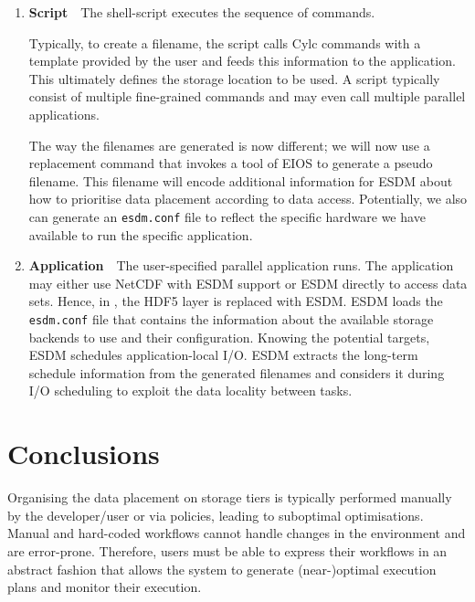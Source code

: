 \documentclass[a4paper]{article}
\begin{document}
\begin{enumerate}
  \item \textbf{Script}\ \ The shell-script executes the sequence of commands.

  Typically, to create a filename, the script calls Cylc commands with a template provided by the user and feeds this information to the application.
  This ultimately defines the storage location to be used.
  A script typically consist of multiple fine-grained commands and may even call multiple parallel applications.

  The way the filenames are generated is now different; we will now use a replacement command that invokes a tool of EIOS to generate a pseudo filename.
  This filename will encode additional information for ESDM about how to prioritise data placement according to data access.
  Potentially, we also can generate an \texttt{esdm.conf} file to reflect the specific hardware we have available to run the specific application.

  \item \textbf{Application}\ \ The user-specified parallel application runs.
  The application may either use NetCDF with ESDM support or ESDM directly to access data sets.
  Hence, in , the HDF5 layer is replaced with ESDM.
  ESDM loads the \texttt{esdm.conf} file that contains the information about the available storage backends to use and their configuration.
  Knowing the potential targets, ESDM schedules application-local I/O.
  ESDM extracts the long-term schedule information from the generated filenames and considers it during I/O scheduling to exploit the data locality between tasks.
\end{enumerate}



\section{Conclusions}
\label{sec:conclusions}

Organising the data placement on storage tiers is typically performed manually by the developer/user or via policies, leading to suboptimal optimisations.
Manual and hard-coded workflows cannot handle changes in the environment and are error-prone.
Therefore, users must be able to express their workflows in an abstract fashion that allows the system to generate (near-)optimal execution plans and monitor their execution.
\end{document}
